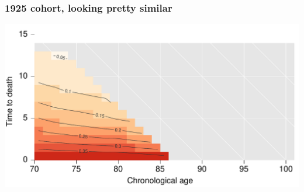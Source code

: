 \documentclass[20pt]{beamer}
\begin{document}
\begin{frame}
\frametitle{1925 cohort, looking pretty similar}
\vspace{-4em}
\begin{center}
\includegraphics[scale=1]{Figures/srhpoor1925.pdf}
\end{center}
\end{frame}

\end{document}
